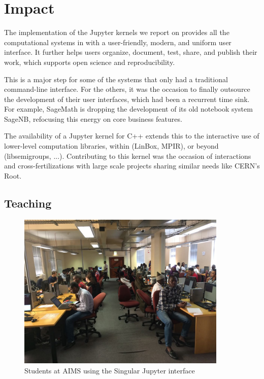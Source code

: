 \documentclass{deliverablereport}
\begin{document}

\section{Impact}

The implementation of the Jupyter kernels we report on provides all
the computational systems in \ODK with a user-friendly, modern, and
uniform user interface. It further helps users organize, document,
test, share, and publish their work, which supports open science and
reproducibility.

This is a major step for some of the systems that only had a
traditional command-line interface. For the others, it was the
occasion to finally outsource the development of their user
interfaces, which had been a recurrent time sink. For example,
SageMath is dropping the development of its old notebook system
SageNB, refocusing this energy on core business features.

The availability of a Jupyter kernel for C++ extends this to the
interactive use of lower-level computation libraries, within \ODK
(LinBox, MPIR), or beyond (libsemigroups, ...). Contributing to this
kernel was the occasion of interactions and cross-fertilizations with
large scale projects sharing similar needs like CERN's Root.

\subsection{Teaching}\label{teaching}

\begin{figure}\label{AIMS}
\includegraphics[width=100mm]{IMG-20180124-WA0000.jpg}
\caption{Students at AIMS using the Singular Jupyter interface}
\end{figure}
\end{document}

